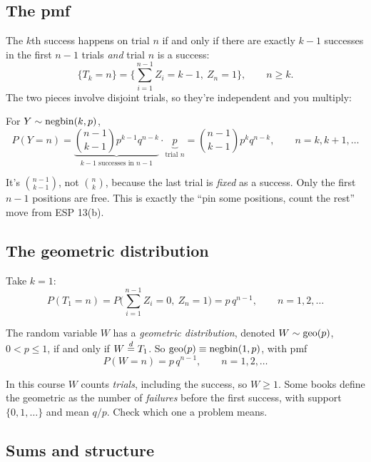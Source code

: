 \subsection{The pmf}

The $k$th success happens on trial $n$ if and only if there are exactly $k-1$ successes in the first $n-1$ trials \emph{and} trial $n$ is a success:
\[
\{T_k = n\} = \Big\{ \textstyle\sum_{i=1}^{n-1} Z_i = k-1,\ Z_n = 1 \Big\}, \qquad n \ge k.
\]
The two pieces involve disjoint trials, so they're independent and you multiply:

\begin{definition}
For $Y \sim \operatorname{negbin}(k,p)$,
\[
P(Y = n) = \underbrace{\binom{n-1}{k-1} p^{k-1} q^{n-k}}_{k-1 \text{ successes in } n-1} \cdot \underbrace{p}_{\text{trial } n}
= \binom{n-1}{k-1} p^k q^{n-k}, \qquad n = k, k+1, \dots
\]
\end{definition}

\begin{remark}
It's $\binom{n-1}{k-1}$, not $\binom{n}{k}$, because the last trial is \emph{fixed} as a success. Only the first $n-1$ positions are free. This is exactly the ``pin some positions, count the rest'' move from ESP 13(b).
\end{remark}

\subsection{The geometric distribution}

Take $k = 1$:
\[
P(T_1 = n) = P\Big(\textstyle\sum_{i=1}^{n-1} Z_i = 0,\ Z_n = 1\Big) = p\,q^{n-1}, \qquad n = 1,2,\dots
\]

\begin{definition}
The random variable $W$ has a \emph{geometric distribution}, denoted $W \sim \operatorname{geo}(p)$, $0 < p \le 1$, if and only if $W \overset{d}{=} T_1$. So $\operatorname{geo}(p) \equiv \operatorname{negbin}(1,p)$, with pmf
\[
P(W = n) = p\,q^{n-1}, \qquad n = 1, 2, \dots
\]
\end{definition}

\begin{remark}[Convention]
In this course $W$ counts \emph{trials}, including the success, so $W \ge 1$. Some books define the geometric as the number of \emph{failures} before the first success, with support $\{0,1,\dots\}$ and mean $q/p$. Check which one a problem means.
\end{remark}

\subsection{Sums and structure}

